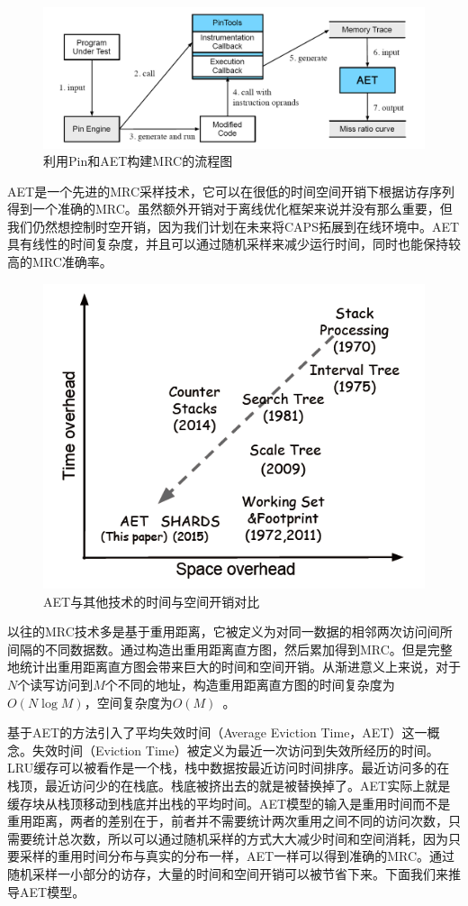 \begin{figure}[htbp] 
    \centering
    \includegraphics[width=0.8\linewidth]{figures/pin.png}
    \caption{利用Pin和AET构建MRC的流程图}
    \label{fig:pin}
\end{figure}

AET是一个先进的MRC采样技术，它可以在很低的时间空间开销下根据访存序列得到一个准确的MRC。虽然额外开销对于离线优化框架来说并没有那么重要，但我们仍然想控制时空开销，因为我们计划在未来将CAPS拓展到在线环境中。AET具有线性的时间复杂度，并且可以通过随机采样来减少运行时间，同时也能保持较高的MRC准确率。

\begin{figure}[htbp] 
    \centering
    \includegraphics[width=0.6\linewidth]{figures/AET_overhead.png}
    \caption{AET与其他技术的时间与空间开销对比}
    \label{fig:AET_overhead}
\end{figure}

以往的MRC技术多是基于重用距离，它被定义为对同一数据的相邻两次访问间所间隔的不同数据数。通过构造出重用距离直方图，然后累加得到MRC。但是完整地统计出重用距离直方图会带来巨大的时间和空间开销。从渐进意义上来说，对于$N$个读写访问到$M$个不同的地址，构造重用距离直方图的时间复杂度为$O(N\log M)$，空间复杂度为$O(M)$~\cite{olken1981efficient}。

基于AET的方法引入了平均失效时间（Average Eviction Time，AET）这一概念。失效时间（Eviction Time）被定义为最近一次访问到失效所经历的时间。LRU缓存可以被看作是一个栈，栈中数据按最近访问时间排序。最近访问多的在栈顶，最近访问少的在栈底。栈底被挤出去的就是被替换掉了。AET实际上就是缓存块从栈顶移动到栈底并出栈的平均时间。AET模型的输入是重用时间而不是重用距离，两者的差别在于，前者并不需要统计两次重用之间不同的访问次数，只需要统计总次数，所以可以通过随机采样的方式大大减少时间和空间消耗，因为只要采样的重用时间分布与真实的分布一样，AET一样可以得到准确的MRC。通过随机采样一小部分的访存，大量的时间和空间开销可以被节省下来。下面我们来推导AET模型。

